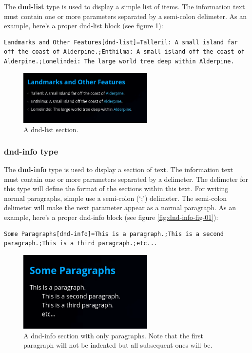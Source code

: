The \textbf{dnd-list} type is used to display a simple list of items. The information text must contain one or more parameters separated by a semi-colon delimeter. As an example, here's a proper dnd-list block (see figure \ref{fig:dnd-list-fig}):

\begin{lstlisting}
Landmarks and Other Features[dnd-list]=Talleril: A small island far off the coast of Alderpine.;Enthilma: A small island off the coast of Alderpine.;Lomelindei: The large world tree deep within Alderpine.
\end{lstlisting}

\begin{figure}[h]
	\centering
	\includegraphics[width=0.6\textwidth]{images/dnd-list-section.png}
	\caption{A dnd-list section.}
	\label{fig:dnd-list-fig}
\end{figure}

\subsubsection{dnd-info type}

The \textbf{dnd-info} type is used to display a section of text. The information text must contain one or more parameters separated by a delimeter. The delimeter for this type will define the format of the sections within this text. For writing normal paragraphs, simple use a semi-colon (`;') delimeter. The semi-colon delimeter will make the next parameter appear as a normal paragraph. As an example, here's a proper dnd-info block (see figure \ref{fig:dnd-info-fig-01}):

\begin{lstlisting}
Some Paragraphs[dnd-info]=This is a paragraph.;This is a second paragraph.;This is a third paragraph.;etc...
\end{lstlisting}

\begin{figure}[h]
	\centering
	\includegraphics[width=0.6\textwidth]{images/dnd-info-section-01.png}
	\caption{A dnd-info section with only paragraphs. Note that the first paragraph will not be indented but all subsequent ones will be.}
	\label{fig:dnd-info-fig-1}
\end{figure}

